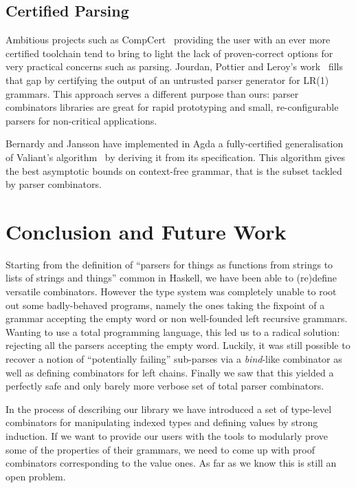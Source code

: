 \subsection{Certified Parsing}

Ambitious projects such as CompCert~\cite{leroy2012compcert} providing
the user with an ever more certified toolchain tend to bring to light
the lack of proven-correct options for very practical concerns such as
parsing. Jourdan, Pottier and Leroy's work~\cite{jourdan2012validating}
fills that gap by certifying the output of an untrusted parser generator
for LR(1) grammars. This approach serves a different purpose than ours:
parser combinators libraries are great for rapid prototyping and small,
re-configurable parsers for non-critical applications.

Bernardy and Jansson have implemented in Agda a fully-certified generalisation
of Valiant's algorithm~\cite{bernardy2016certified} by deriving it from
its specification. This algorithm gives the best asymptotic bounds on
context-free grammar, that is the  subset tackled by
parser combinators.

\section{Conclusion and Future Work}

Starting from the definition of ``parsers for things as functions from
strings to lists of strings and things'' common in Haskell, we have been
able to (re)define versatile combinators. However the type system was
completely unable to root out some badly-behaved programs, namely the
ones taking the fixpoint of a grammar accepting the empty word or non
well-founded left recursive grammars. Wanting to use a total programming
language, this led us to a radical solution: rejecting all the parsers
accepting the empty word. Luckily, it was still possible to recover a
notion of ``potentially failing'' sub-parses via a \textit{bind}-like
combinator as well as defining combinators for left chains. Finally we
saw that this yielded a perfectly safe and only barely more verbose set
of total parser combinators.

In the process of describing our library we have introduced a set of
type-level combinators for manipulating indexed types and defining
values by strong induction. If we want to provide our users with the
tools to modularly prove some of the properties of their grammars, we
need to come up with proof combinators corresponding to the value ones.
As far as we know this is still an open problem.
